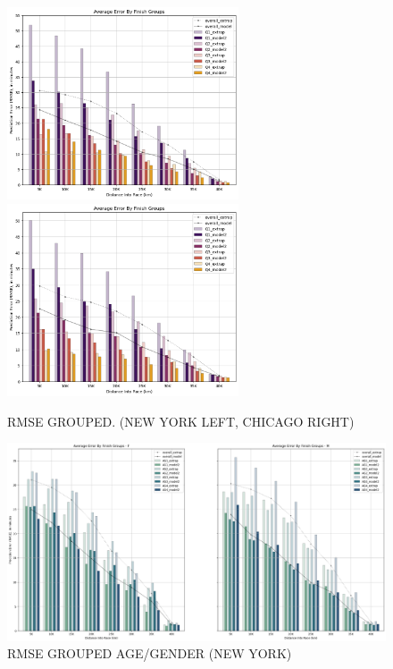 \documentclass[USenglish,twocolumn]{article}
\theoremstyle{dgthm}
\theoremstyle{dgdef}
\begin{document}
\begin{figure}[ht]
    \centering
    \includegraphics[width=2.7in]{../analysis/plots/nyc_rmse_groups.png}
    \includegraphics[width=2.7in]{../analysis/plots/chi_rmse_groups.png}
    \caption{RMSE GROUPED. (NEW YORK LEFT, CHICAGO RIGHT)}
\end{figure}

\begin{figure}[ht]
    \centering
    \includegraphics[width=6.2in]{../analysis/plots/nyc_rmse_gender_age.png}
    \caption{RMSE  GROUPED AGE/GENDER (NEW YORK)}
\end{figure}
\end{document}

